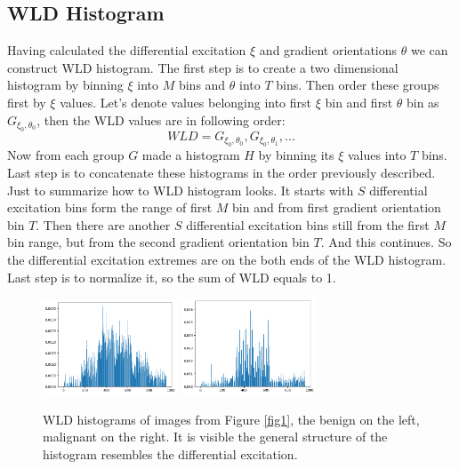 \documentclass[a4paper,10pt,twocolumn]{article}
\begin{document}
\subsection{WLD Histogram}

Having calculated the differential excitation $\xi$ and gradient orientations $\theta$ we can construct WLD histogram.
The first step is to create a two dimensional histogram by binning $\xi$ into $M$ bins and $\theta$ into $T$ bins.
Then order these groups first by $\xi$ values.
Let's denote values belonging into first $\xi$ bin and first $\theta$ bin as $G_{\xi_0, \theta_0}$, then the WLD values are in following order:
$$WLD = G_{\xi_0, \theta_0}, G_{\xi_0, \theta_1},... $$
Now from each group $G$ made a histogram $H$ by binning its $\xi$ values into $T$ bins.
Last step is to concatenate these histograms in the order previously described.
Just to summarize how to WLD histogram looks.
It starts with $S$ differential excitation bins form the range of first $M$ bin and from first gradient orientation bin $T$.
Then there are another $S$ differential excitation bins still from the first $M$ bin range, but from the second gradient orientation bin $T$.
And this continues.
So the differential excitation extremes are on the both ends of the WLD histogram.
Last step is to normalize it, so the sum of WLD equals to 1.

\begin{figure}[H]
      \begin{center}
            \includegraphics[width=4cm]{benign_wld}
            \includegraphics[width=4cm]{malignant_wld}
      \end{center}
      \caption{WLD histograms of images from Figure \ref{fig1}, the benign on the left, malignant on the right. It is visible the general structure of the histogram resembles the differential excitation.}
      \label{fig2}
\end{figure}
\end{document}
